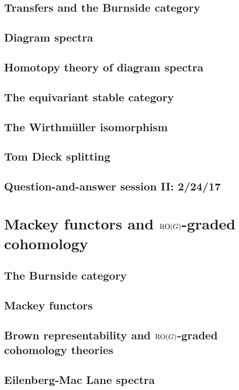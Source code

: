 \documentclass[openany]{style_EHT}
\begin{document}
\section{Transfers and the Burnside category}
	
\section{Diagram spectra}
	
\section{Homotopy theory of diagram spectra}
	
\section{The equivariant stable category}
	
\section{The Wirthmüller isomorphism}
	
\section{Tom Dieck splitting}
	
\section{Question-and-answer session II: 2/24/17}
	

\chapter{Mackey functors and $\mathrm{RO}(G)$-graded cohomology}
\section{The Burnside category}
	
\section{Mackey functors}
	
\section{Brown representability and $\mathrm{RO}(G)$-graded cohomology theories}
	
\section{Eilenberg-Mac Lane spectra}
	
\end{document}
